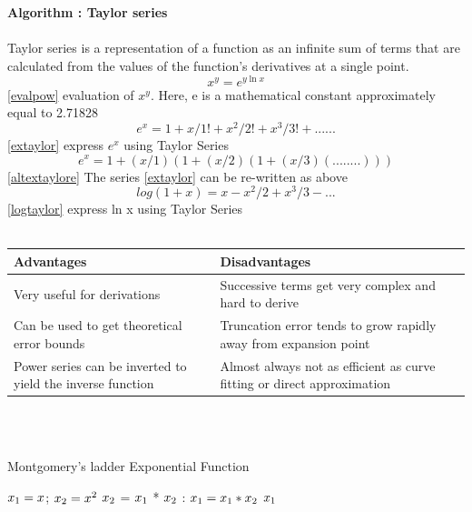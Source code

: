 \documentclass[a4paper, 11pt]{report}
\begin{document}
\textbf{\\ \\ Algorithm : Taylor series}\\ \\Taylor series is a representation of a function as an infinite sum of terms that are calculated from the values of the function's derivatives at a single point.
\begin{equation} \label{evalpow}
x^y= e^{y\ln x}
\end{equation}
\ref{evalpow} evaluation of $x^y$. Here, e is a mathematical constant approximately equal to  2.71828
\begin{equation} \label{extaylor}
e^x = 1 + x/1! + x^2/2! + x^3/3! + ...... 
\end{equation}
\ref{extaylor} express $e^x$ using Taylor Series
\begin{equation} \label{altextaylore}
e^x = 1 + (x/1) (1 + (x/2) (1 + (x/3) (........) ) ) 
\end{equation}
\ref{altextaylore} The series \ref{extaylor} can be re-written as above
\begin{equation} \label{logtaylor}
log(1+x) = x-x^2/2 + x^3/3- ... 
\end{equation}
\ref{logtaylor} express ln x using Taylor Series\\ \\

\setlength{\tabcolsep}{18pt}
\renewcommand{\arraystretch}{1.5}
\begin{tabular}{ |p{6cm}|p{6cm}| }
\hline
\textbf{Advantages} & \textbf{Disadvantages}\\ \hline 
Very useful for derivations
 & Successive terms get very complex and hard to derive\\
\hline
Can be used to get theoretical error bounds &Truncation error tends to grow rapidly away from expansion point\\
\hline
Power series can be inverted to yield the inverse function & Almost always not as efficient as curve fitting or direct approximation\\
\hline
\end{tabular} \\ \\ 
\begin{algorithm}
\caption{Montgomery's ladder Exponential Function}\label{exp3}
\begin{algorithmic}[1]
\Require $x\textsubscript{1} = x$; $x\textsubscript{2} = x^2$
\State  $x\textsubscript{2}$ = $x\textsubscript{1}$ * $x\textsubscript{2}$ 
 \Else:
\State $x\textsubscript{1} = x\textsubscript{1} * x\textsubscript{2}$   
\State \Return $x\textsubscript{1}$
 \EndIf
 \EndFor
\end{algorithmic}
\end{algorithm}
\end{document}
